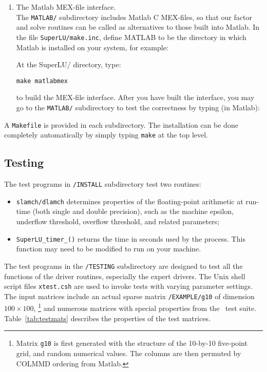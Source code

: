 \begin{enumerate}
\item The Matlab MEX-file interface.\\
   The {\tt MATLAB/} subdirectory includes Matlab C MEX-files, so that 
   our factor and solve routines can be called as alternatives to those
   built into Matlab. In the file {\tt SuperLU/make.inc}, 
   define MATLAB to be the 
   directory in which Matlab is installed on your system, for example:

   \hspace{.4in}{\tt MATLAB = /usr/local/matlab}

   At the SuperLU/ directory, type:

   \hspace{.4in} {\tt make matlabmex} 

   to build the MEX-file
   interface. After you have built the interface, you may go to the 
   {\tt MATLAB/} subdirectory to test the correctness by typing (in Matlab):
   
   \hspace{.4in}{\tt trysuperlu}

   \hspace{.4in}{\tt trylusolve}

\end{enumerate}


A {\tt Makefile} is provided in each subdirectory.
The installation can be done completely automatically by simply 
typing {\tt make} at the top level.

\subsection{Testing}
The test programs in {\tt \SuperLU/INSTALL} subdirectory test two routines:
\begin{itemize}
\item {\tt slamch/dlamch} determines properties of the floating-point
      arithmetic at run-time (both single and double precision), such as
      the machine epsilon, underflow threshold, overflow threshold, 
      and related parameters;
\item {\tt SuperLU\_timer\_()} returns the time in seconds used by the
      process. This function may need to be modified to run on your machine.
\end{itemize}

The test programs in the {\tt \SuperLU/TESTING} subdirectory are designed to 
test all the functions of the driver routines, especially the expert drivers.
The Unix shell script files {\tt xtest.csh} are used to invoke tests
with varying parameter settings. The input matrices include an actual 
sparse matrix {\tt \SuperLU/EXAMPLE/g10} of dimension $100\times 100$,%
\footnote{Matrix {\tt g10} is first generated with the structure of
the 10-by-10 five-point grid, and random numerical values. The
columns are then permuted by COLMMD ordering from Matlab.}
and numerous matrices with special properties from the \LAPACK\ test suite. 
Table~\ref{tab:testmats} describes the properties of the test matrices.

